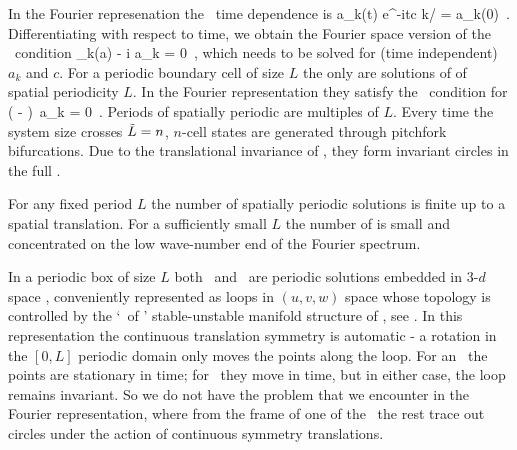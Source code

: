 %

In the Fourier represenation the \reqva\ time
dependence is
\beq
 a_k(t) e^{-itc k/\tildeL} = a_k(0)
\,.
Differentiating with respect to time, we obtain
the Fourier space version of the \reqv\ condition
\beq
 \pVeloc_k(a) - i  a_k = 0
\,,
which needs to be solved for (time independent) $a_k$ and $c$.
For a periodic boundary cell of size
$L$ the only {\eqva}  are
solutions of  of spatial periodicity $L$.
In the Fourier representation they satisfy
the \eqv\ condition for 
\beq
\left(  -   \right)\, a_k
  = 0
\,.
\label{eq:stfks}
\eeq
Periods of spatially periodic {\eqva} are multiples of $L$.
Every time the system size crosses  $\tilde{L}=n$,
$n$-cell states
are generated through pitchfork bifurcations.
Due to the translational invariance of {\KSe},
they form invariant circles
in the full \statesp.

For any fixed period $L$ the number
of spatially periodic solutions is finite up to a spatial translation.
For a sufficiently small $L$
the number of {\eqva} is small and
concentrated on the low wave-number end of the Fourier spectrum.

In a periodic box of size $L$
both \eqva\ and \reqva\ are  periodic solutions
embedded in 3-$d$ space ,
conveniently represented as loops in
$(u,v,w)$ space whose topology is controlled by the
`\eqva\ of \eqva' stable-unstable manifold structure of
, see .
In this representation the continuous translation symmetry
is automatic - a rotation in the $[0,L]$ periodic domain only
moves the points along the loop. For an \eqv\ the points
are stationary in time; for \reqv\ they move in time, but in
either case, the loop remains invariant.
So we do not have the problem that we encounter in the Fourier
representation, where from the frame of one of the \eqva\
the rest trace out circles under the action of continuous symmetry
translations.

